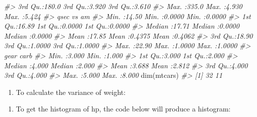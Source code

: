 \documentclass[
]{book}
\newenvironment{Shaded}{\begin{snugshade}}{\end{snugshade}}
\newcommand{\CommentTok}[1]{\textcolor[rgb]{0.56,0.35,0.01}{\textit{#1}}}
\newcommand{\FunctionTok}[1]{\textcolor[rgb]{0.00,0.00,0.00}{#1}}
\newcommand{\NormalTok}[1]{#1}
\newcommand{\SpecialCharTok}[1]{\textcolor[rgb]{0.00,0.00,0.00}{#1}}
\providecommand{\tightlist}{%
  \setlength{\itemsep}{0pt}\setlength{\parskip}{0pt}}
\begin{document}
\begin{Shaded}
\begin{Highlighting}[]
\CommentTok{\#\textgreater{}  3rd Qu.:180.0   3rd Qu.:3.920   3rd Qu.:3.610  }
\CommentTok{\#\textgreater{}  Max.   :335.0   Max.   :4.930   Max.   :5.424  }
\CommentTok{\#\textgreater{}       qsec             vs               am        }
\CommentTok{\#\textgreater{}  Min.   :14.50   Min.   :0.0000   Min.   :0.0000  }
\CommentTok{\#\textgreater{}  1st Qu.:16.89   1st Qu.:0.0000   1st Qu.:0.0000  }
\CommentTok{\#\textgreater{}  Median :17.71   Median :0.0000   Median :0.0000  }
\CommentTok{\#\textgreater{}  Mean   :17.85   Mean   :0.4375   Mean   :0.4062  }
\CommentTok{\#\textgreater{}  3rd Qu.:18.90   3rd Qu.:1.0000   3rd Qu.:1.0000  }
\CommentTok{\#\textgreater{}  Max.   :22.90   Max.   :1.0000   Max.   :1.0000  }
\CommentTok{\#\textgreater{}       gear            carb      }
\CommentTok{\#\textgreater{}  Min.   :3.000   Min.   :1.000  }
\CommentTok{\#\textgreater{}  1st Qu.:3.000   1st Qu.:2.000  }
\CommentTok{\#\textgreater{}  Median :4.000   Median :2.000  }
\CommentTok{\#\textgreater{}  Mean   :3.688   Mean   :2.812  }
\CommentTok{\#\textgreater{}  3rd Qu.:4.000   3rd Qu.:4.000  }
\CommentTok{\#\textgreater{}  Max.   :5.000   Max.   :8.000}
\FunctionTok{dim}\NormalTok{(mtcars)}
\CommentTok{\#\textgreater{} [1] 32 11}
\end{Highlighting}
\end{Shaded}

\begin{enumerate}
\def\labelenumi{\arabic{enumi}.}
\setcounter{enumi}{3}
\tightlist
\item
  To calculate the variance of weight:
\end{enumerate}

\begin{Shaded}
\end{Shaded}

\begin{enumerate}
\def\labelenumi{\arabic{enumi}.}
\setcounter{enumi}{4}
\tightlist
\item
  To get the histogram of hp, the code below will produce a histogram:
\end{enumerate}

\begin{Shaded}
\end{Shaded}
\end{document}
